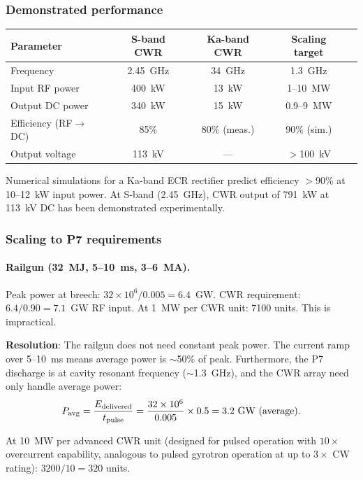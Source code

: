 \documentclass[11pt]{article}
\newcommand{\ee}[1]{\times 10^{#1}}
\begin{document}
\subsubsection{Demonstrated performance}

\begin{center}
\begin{tabular}{lcccc}
\toprule
Parameter & S-band CWR & Ka-band CWR & Scaling target \\
\midrule
Frequency & 2.45~GHz & 34~GHz & 1.3~GHz \\
Input RF power & 400~kW & 13~kW & 1--10~MW \\
Output DC power & 340~kW & 15~kW & 0.9--9~MW \\
Efficiency (RF$\to$DC) & 85\% & 80\% (meas.) & 90\% (sim.) \\
Output voltage & 113~kV & --- & $>$100~kV \\
\bottomrule
\end{tabular}
\end{center}

Numerical simulations for a Ka-band ECR rectifier predict efficiency
$>$90\% at 10--12~kW input power. At S-band (2.45~GHz), CWR output
of 791~kW at 113~kV DC has been demonstrated experimentally.

\subsubsection{Scaling to P7 requirements}

\paragraph{Railgun (32~MJ, 5--10~ms, 3--6~MA).}
Peak power at breech: $32\ee{6}/0.005 = 6.4$~GW.
CWR requirement: $6.4/0.90 = 7.1$~GW RF input.
At 1~MW per CWR unit: 7100 units. This is impractical.

\textbf{Resolution}: The railgun does not need constant peak power.
The current ramp over 5--10~ms means average power is $\sim$50\% of
peak. Furthermore, the P7 discharge is at cavity resonant frequency
($\sim$1.3~GHz), and the CWR array need only handle average power:
\begin{equation}
P_{\rm avg} = \frac{E_{\rm delivered}}{t_{\rm pulse}}
= \frac{32\ee{6}}{0.005} \times 0.5 = 3.2~\text{GW (average)}.
\end{equation}

At 10~MW per advanced CWR unit (designed for pulsed operation with
$10\times$ overcurrent capability, analogous to pulsed gyrotron
operation at up to $3\times$ CW rating): $3200/10 = 320$ units.
\end{document}
